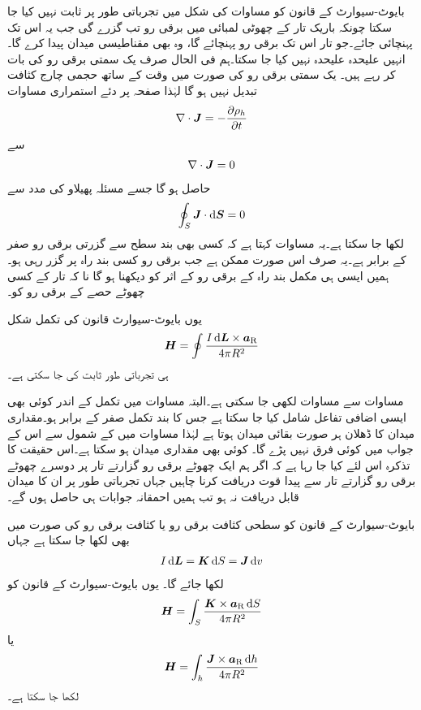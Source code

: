 بایوٹ-سیوارٹ کے قانون کو مساوات  کی شکل میں تجرباتی طور پر ثابت نہیں کیا جا سکتا چونکہ باریک تار کے چھوٹی لمبائی میں برقی رو تب گزرے گی جب یہ اس تک پہنچائی جائے۔جو تار اس تک برقی رو پہنچائے گا، وہ بھی مقناطیسی میدان پیدا کرے گا۔انہیں علیحدہ علیحدہ نہیں کیا جا سکتا۔ہم فی الحال صرف یک سمتی برقی رو کی بات کر رہے ہیں۔ یک سمتی برقی رو کی صورت میں وقت کے ساتھ حجمی چارج کثافت تبدیل نہیں ہو گا لہٰذا صفحہ  پر دئے  استمراری مساوات
\begin{align*}
\nabla \cdot {\ensuremath{{\boldsymbol{J}}}}=-\frac{\partial \rho_h}{\partial t}
\end{align*}
سے
\begin{align}\label{مساوات_مقناطیسی_صرف_مکمل_بند_راہ}
\nabla \cdot {\ensuremath{{\boldsymbol{J}}}}=0
\end{align}
حاصل ہو گا جسے مسئلہ پھیلاو کی مدد سے
\begin{align*}
\oint_S  \kvec{J} \cdot \dif \kvec{S}=0
\end{align*}
لکھا جا سکتا ہے۔یہ مساوات کہتا ہے کہ کسی بھی بند سطح سے گزرتی برقی رو صفر کے برابر ہے۔یہ صرف اس صورت ممکن ہے جب برقی رو کسی بند راہ پر گزر رہی ہو۔ہمیں ایسی ہی مکمل بند راہ کے برقی رو کے اثر کو دیکھنا ہو گا نا کہ تار کے کسی چھوٹے حصے  کے برقی رو کو۔ 

یوں بایوٹ-سیوارٹ قانون کی تکمل شکل
\begin{align}\label{مساوات_بایوٹ_سیوارٹ_تکمل_شکل}
\kvec{H}=\oint \frac{I \dif \kvec{L} \times \aR}{4 \pi R^2}
\end{align}
ہی تجرباتی طور ثابت کی جا سکتی ہے۔

مساوات  سے مساوات  لکھی جا سکتی ہے۔البتہ مساوات  میں تکمل کے اندر کوئی بھی ایسی اضافی تفاعل شامل کیا جا سکتا ہے جس کا بند تکمل صفر کے برابر ہو۔مقداری میدان کا ڈھلان ہر صورت بقائی میدان ہوتا ہے لہٰذا مساوات  میں  کے شمول سے اس کے جواب میں کوئی فرق نہیں پڑے گا۔ کوئی بھی مقداری میدان ہو سکتا ہے۔اس حقیقت کا تذکرہ اس لئے کیا جا رہا ہے کہ اگر ہم ایک چھوٹے برقی رو گزارتے تار پر دوسرے  چھوٹے برقی رو گزارتے تار سے پیدا قوت دریافت کرنا چاہیں جہاں تجرباتی طور پر ان کا میدان قابل دریافت نہ ہو تب ہمیں احمقانہ جوابات ہی حاصل ہوں گے۔

بایوٹ-سیوارٹ کے قانون کو سطحی کثافت برقی رو  یا کثافت برقی رو  کی صورت میں بھی لکھا جا سکتا ہے جہاں
\begin{align}
I \dif \kvec{L}=\kvec{K} \dif S=\kvec{J} \dif v
\end{align}
لکھا جائے گا۔ یوں بایوٹ-سیوارٹ کے قانون کو
\begin{align}
\kvec{H}=\int_S \frac{\kvec{K} \times \aR \dif S}{4\pi R^2}
\end{align}
یا
\begin{align}
\kvec{H}=\int_h \frac{\kvec{J} \times \aR \dif h}{4\pi R^2}
\end{align}
لکھا جا سکتا ہے۔

